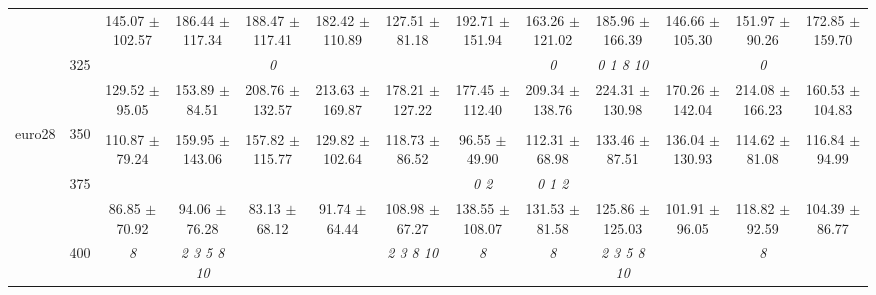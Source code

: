 \begin{table}[h]
{\begin{tabular}{
        ccccccccccccc}
 & & 145.07 $\pm$ 102.57& 186.44 $\pm$ 117.34& 188.47 $\pm$ 117.41& 182.42 $\pm$ 110.89& 127.51 $\pm$ 81.18& 192.71 $\pm$ 151.94& 163.26 $\pm$ 121.02& 185.96 $\pm$ 166.39& 146.66 $\pm$ 105.30& 151.97 $\pm$ 90.26& 172.85 $\pm$ 159.70 \\ 
 & \multirow{2}{*}{325}& \cellcolor[HTML]{EFEFEF} & \cellcolor[HTML]{EFEFEF} & \cellcolor[HTML]{EFEFEF} \textit{ 0 }& \cellcolor[HTML]{EFEFEF} & \cellcolor[HTML]{EFEFEF} & \cellcolor[HTML]{EFEFEF} & \cellcolor[HTML]{EFEFEF} \textit{ 0 }& \cellcolor[HTML]{EFEFEF} \textit{  0  1  8 10 }& \cellcolor[HTML]{EFEFEF} & \cellcolor[HTML]{EFEFEF} \textit{ 0 }& \cellcolor[HTML]{EFEFEF}  \\ 
 & & \cellcolor[HTML]{EFEFEF} 129.52 $\pm$ 95.05& \cellcolor[HTML]{EFEFEF} 153.89 $\pm$ 84.51& \cellcolor[HTML]{EFEFEF} 208.76 $\pm$ 132.57& \cellcolor[HTML]{EFEFEF} 213.63 $\pm$ 169.87& \cellcolor[HTML]{EFEFEF} 178.21 $\pm$ 127.22& \cellcolor[HTML]{EFEFEF} 177.45 $\pm$ 112.40& \cellcolor[HTML]{EFEFEF} 209.34 $\pm$ 138.76& \cellcolor[HTML]{EFEFEF} 224.31 $\pm$ 130.98& \cellcolor[HTML]{EFEFEF} 170.26 $\pm$ 142.04& \cellcolor[HTML]{EFEFEF} 214.08 $\pm$ 166.23& \cellcolor[HTML]{EFEFEF} 160.53 $\pm$ 104.83 \\ 
 \multirow{4}{*}{euro28} & \multirow{2}{*}{350}& & & & & & & & & & &  \\ 
 & & 110.87 $\pm$ 79.24& 159.95 $\pm$ 143.06& 157.82 $\pm$ 115.77& 129.82 $\pm$ 102.64& 118.73 $\pm$ 86.52& 96.55 $\pm$ 49.90& 112.31 $\pm$ 68.98& 133.46 $\pm$ 87.51& 136.04 $\pm$ 130.93& 114.62 $\pm$ 81.08& 116.84 $\pm$ 94.99 \\ 
 & \multirow{2}{*}{375}& \cellcolor[HTML]{EFEFEF} & \cellcolor[HTML]{EFEFEF} & \cellcolor[HTML]{EFEFEF} & \cellcolor[HTML]{EFEFEF} & \cellcolor[HTML]{EFEFEF} & \cellcolor[HTML]{EFEFEF} \textit{ 0 2 }& \cellcolor[HTML]{EFEFEF} \textit{ 0 1 2 }& \cellcolor[HTML]{EFEFEF} & \cellcolor[HTML]{EFEFEF} & \cellcolor[HTML]{EFEFEF} & \cellcolor[HTML]{EFEFEF}  \\ 
 & & \cellcolor[HTML]{EFEFEF} 86.85 $\pm$ 70.92& \cellcolor[HTML]{EFEFEF} 94.06 $\pm$ 76.28& \cellcolor[HTML]{EFEFEF} 83.13 $\pm$ 68.12& \cellcolor[HTML]{EFEFEF} 91.74 $\pm$ 64.44& \cellcolor[HTML]{EFEFEF} 108.98 $\pm$ 67.27& \cellcolor[HTML]{EFEFEF} 138.55 $\pm$ 108.07& \cellcolor[HTML]{EFEFEF} 131.53 $\pm$ 81.58& \cellcolor[HTML]{EFEFEF} 125.86 $\pm$ 125.03& \cellcolor[HTML]{EFEFEF} 101.91 $\pm$ 96.05& \cellcolor[HTML]{EFEFEF} 118.82 $\pm$ 92.59& \cellcolor[HTML]{EFEFEF} 104.39 $\pm$ 86.77 \\ 
 & \multirow{2}{*}{400}& \textit{ 8 }& \textit{  2  3  5  8 10 }& & & \textit{  2  3  8 10 }& \textit{ 8 }& \textit{ 8 }& \textit{  2  3  5  8 10 }& & \textit{ 8 }&  \\ 

\end{tabular}}
\end{table}
